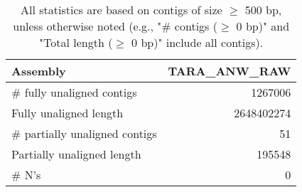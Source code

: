 \documentclass[12pt,a4paper]{article}
\begin{document}
\begin{table}[ht]
\begin{center}
\caption{All statistics are based on contigs of size $\geq$ 500 bp, unless otherwise noted (e.g., "\# contigs ($\geq$ 0 bp)" and "Total length ($\geq$ 0 bp)" include all contigs).}
\begin{tabular}{|l*{1}{|r}|}
\hline
Assembly & TARA\_ANW\_RAW \\ \hline
\# fully unaligned contigs & 1267006 \\ \hline
Fully unaligned length & 2648402274 \\ \hline
\# partially unaligned contigs & 51 \\ \hline
Partially unaligned length & 195548 \\ \hline
\# N's & 0 \\ \hline
\end{tabular}
\end{center}
\end{table}
\end{document}
